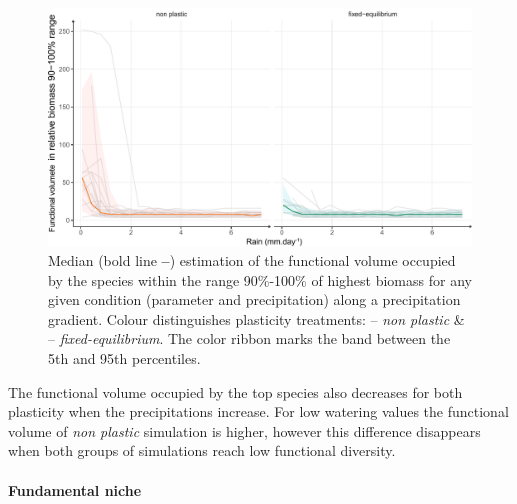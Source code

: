 \begin{figure}\label{fig:functional_div_grad}
\includegraphics[width = \textwidth]{./2_PP/Figures/Rain/gradient_plot_fdiv10.pdf}
\caption[Functional diversity of the best performing species along a precipitation gradient]{Median (bold line \textbf{--}) estimation of the functional volume occupied by the species within the range 90\%-100\% of highest biomass for any given condition (parameter and precipitation) along a precipitation gradient.  Colour distinguishes plasticity treatments: \textcolor{myOrange}{-- \textit{non plastic}} \&  \textcolor{myGreen}{-- \textit{fixed-equilibrium}}. The color ribbon marks the band between the 5th and 95th percentiles.} \end{figure}

The functional volume occupied by the top species also decreases for both plasticity when the precipitations increase. For low watering values the functional volume of \textit{non plastic} simulation is higher, however this difference disappears when both groups of simulations reach low functional diversity.

\paragraph{Fundamental niche}


